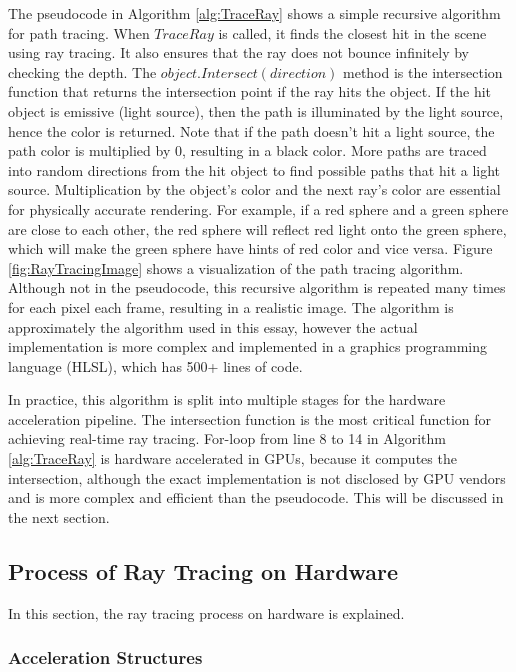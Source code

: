 \documentclass[12pt]{article}
\begin{document}
The pseudocode in Algorithm \ref{alg:TraceRay} shows a simple recursive algorithm for path tracing.
When $TraceRay$ is called, it finds the closest hit in the scene using ray tracing.
It also ensures that the ray does not bounce infinitely by checking the depth.
The $object.Intersect(direction)$ method is the intersection function that returns the intersection point if the ray hits the object.
If the hit object is emissive (light source), then the path is illuminated by the light source, hence the color is returned.
Note that if the path doesn't hit a light source, the path color is multiplied by 0, resulting in a black color. More paths are traced into random directions from the hit object to find possible paths that hit a light source. Multiplication by the object's color and the next ray's color are essential for physically accurate rendering. For example, if a red sphere and a green sphere are close to each other, the red sphere will reflect red light onto the green sphere, which will make the green sphere have hints of red color and vice versa.
Figure \ref{fig:RayTracingImage} shows a visualization of the path tracing algorithm.
Although not in the pseudocode, this recursive algorithm is repeated many times for each pixel each frame, resulting in a realistic image.
The algorithm is approximately the algorithm used in this essay, however the actual implementation is more complex and implemented in a graphics programming language (HLSL), which has 500+ lines of code.

In practice, this algorithm is split into multiple stages for the hardware acceleration pipeline.
The intersection function is the most critical function for achieving real-time ray tracing.
For-loop from line 8 to 14 in Algorithm \ref{alg:TraceRay} is hardware accelerated in GPUs, because it computes the intersection, although the exact implementation is not disclosed by GPU vendors and is more complex and efficient than the pseudocode. \parencite[Part~5]{NVIDIA:RTGems2}
This will be discussed in the next section.

\subsection{Process of Ray Tracing on Hardware}
In this section, the ray tracing process on hardware is explained.

\subsubsection{Acceleration Structures}
\end{document}

